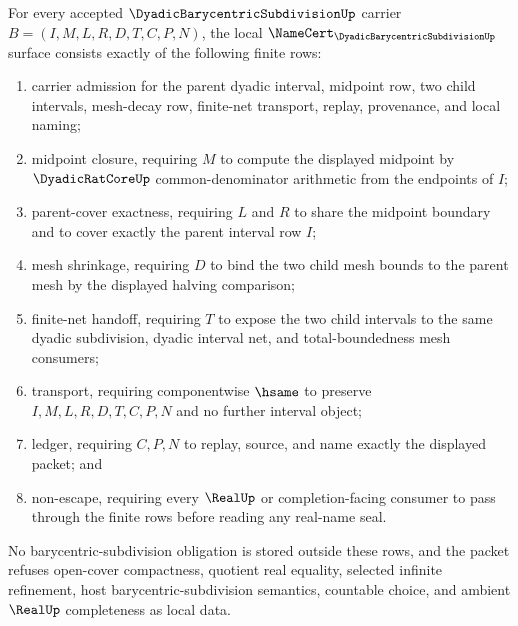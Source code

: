 \begin{theorem}
\label{thm:dyadic-barycentric-subdivision-namecert-obligations}
For every accepted $\DyadicBarycentricSubdivisionUp$ carrier $B=(I,M,L,R,D,T,C,P,N)$, the local $\NameCert_{\DyadicBarycentricSubdivisionUp}$ surface consists exactly of the following finite rows:
\begin{enumerate}
\item carrier admission for the parent dyadic interval, midpoint row, two child intervals, mesh-decay row, finite-net transport, replay, provenance, and local naming;
\item midpoint closure, requiring $M$ to compute the displayed midpoint by $\DyadicRatCoreUp$ common-denominator arithmetic from the endpoints of $I$;
\item parent-cover exactness, requiring $L$ and $R$ to share the midpoint boundary and to cover exactly the parent interval row $I$;
\item mesh shrinkage, requiring $D$ to bind the two child mesh bounds to the parent mesh by the displayed halving comparison;
\item finite-net handoff, requiring $T$ to expose the two child intervals to the same dyadic subdivision, dyadic interval net, and total-boundedness mesh consumers;
\item transport, requiring componentwise $\hsame$ to preserve $I,M,L,R,D,T,C,P,N$ and no further interval object;
\item ledger, requiring $C,P,N$ to replay, source, and name exactly the displayed packet; and
\item non-escape, requiring every $\RealUp$ or completion-facing consumer to pass through the finite rows before reading any real-name seal.
\end{enumerate}
No barycentric-subdivision obligation is stored outside these rows, and the packet refuses open-cover compactness, quotient real equality, selected infinite refinement, host barycentric-subdivision semantics, countable choice, and ambient $\RealUp$ completeness as local data.
\end{theorem}
